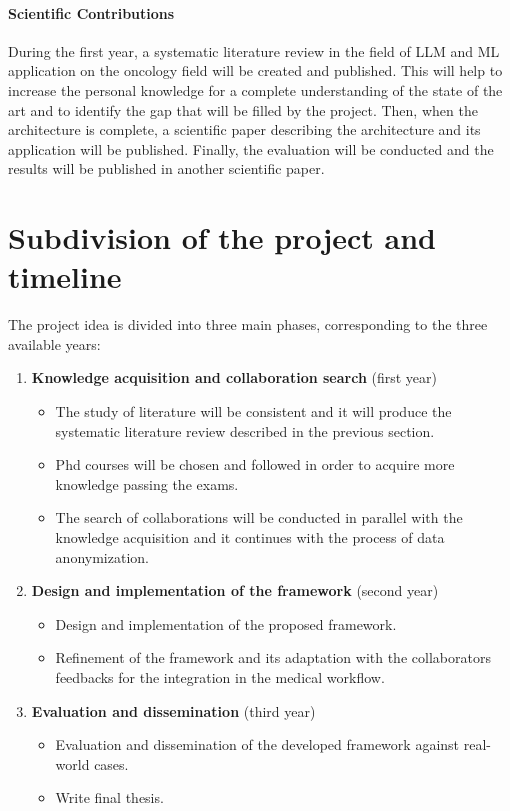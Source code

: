 \documentclass{scrartcl}
\begin{document}
\paragraph{Scientific Contributions}\label{scientific-contribution}{During the first year, a systematic literature review in the field of LLM and ML application on the oncology field will be created and published. This will help to increase the personal knowledge for a complete understanding of the state of the art and to identify the gap that will be filled by the project.
Then, when the architecture is complete, a scientific paper describing the architecture and its application will be published. Finally, the evaluation will be conducted and the results will be published in another scientific paper.
}

\section{Subdivision of the project and timeline}
The project idea is divided into three main phases, corresponding to the three available years:

\begin{enumerate}
    \item \textbf{Knowledge acquisition and collaboration search} (first year)
    \begin{itemize}
        \item The study of literature will be consistent and it will produce the systematic literature review described in the previous section.
        \item Phd courses will be chosen and followed in order to acquire more knowledge passing the exams.
        \item The search of collaborations will be conducted in parallel with the knowledge acquisition and it continues with the process of data anonymization.
    \end{itemize} 
    \item \textbf{Design and implementation of the framework} (second year)
    \begin{itemize}
        \item Design and implementation of the proposed framework.
        \item Refinement of the framework and its adaptation with the collaborators feedbacks for the integration in the medical workflow.
    \end{itemize}
    \item \textbf{Evaluation and dissemination} (third year)
    \begin{itemize}
        \item Evaluation and dissemination of the developed framework against real-world cases.
        \item Write final thesis.
    \end{itemize}
\end{enumerate}
\end{document}
